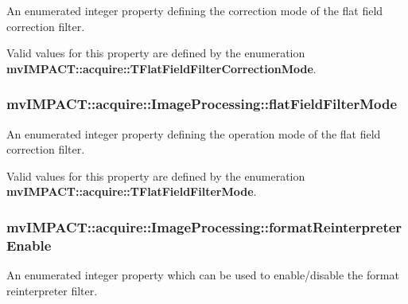An enumerated integer property defining the correction mode of the flat field correction filter. 

Valid values for this property are defined by the enumeration {\bfseries mv\+I\+M\+P\+A\+C\+T\+::acquire\+::\+T\+Flat\+Field\+Filter\+Correction\+Mode}. \hypertarget{classmv_i_m_p_a_c_t_1_1acquire_1_1_image_processing_a228a7aa520bafcdadc2e30718b6052cf}{
\subsubsection[{flat\+Field\+Filter\+Mode}]{ mv\+I\+M\+P\+A\+C\+T\+::acquire\+::\+Image\+Processing\+::flat\+Field\+Filter\+Mode}}\label{classmv_i_m_p_a_c_t_1_1acquire_1_1_image_processing_a228a7aa520bafcdadc2e30718b6052cf}


An enumerated integer property defining the operation mode of the flat field correction filter. 

Valid values for this property are defined by the enumeration {\bfseries mv\+I\+M\+P\+A\+C\+T\+::acquire\+::\+T\+Flat\+Field\+Filter\+Mode}. \hypertarget{classmv_i_m_p_a_c_t_1_1acquire_1_1_image_processing_a15907d13fa374891738730e7addee017}{
\subsubsection[{format\+Reinterpreter\+Enable}]{ mv\+I\+M\+P\+A\+C\+T\+::acquire\+::\+Image\+Processing\+::format\+Reinterpreter\+Enable}}\label{classmv_i_m_p_a_c_t_1_1acquire_1_1_image_processing_a15907d13fa374891738730e7addee017}


An enumerated integer property which can be used to enable/disable the format reinterpreter filter. 

